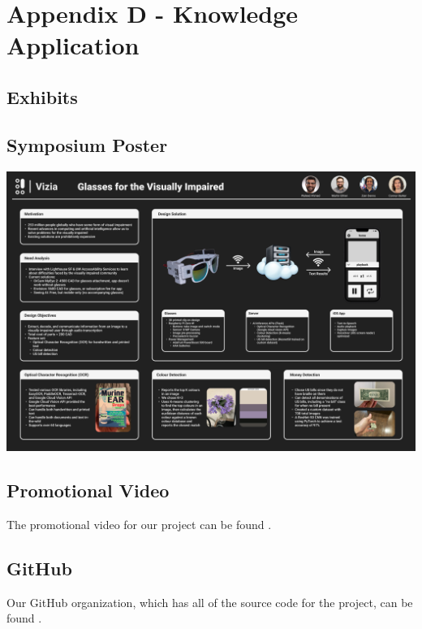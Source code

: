 \documentclass[a4paper,11pt]{article}
\begin{document}
\section{Appendix D - Knowledge Application}

\begin{landscape}
    \section{Exhibits}
    \subsection{Symposium Poster}
    \begin{center}
        \includegraphics[width={1.0\linewidth}]{img/symposium_poster.png}
    \end{center}
\end{landscape}

\subsection{Promotional Video}
The promotional video for our project can be found \href{https://www.youtube.com/watch?v=aw0gHmt1xBc}{\color{blue}{here}}.

\subsection{GitHub}
Our GitHub organization, which has all of the source code for the project, can be found \href{https://github.com/vizia-fydp}{\color{blue}{here}}.
\end{document}
